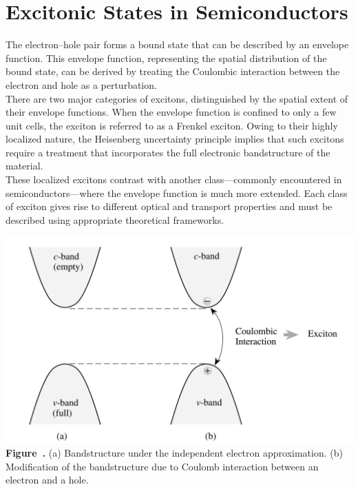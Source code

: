 \section{Excitonic States in Semiconductors}
The electron–hole pair forms a bound state that can be described by an envelope function. This envelope function, representing the spatial distribution of the bound state, can be derived by treating the Coulombic interaction between the electron and hole as a perturbation.\\
There are two major categories of excitons, distinguished by the spatial extent of their envelope functions. When the envelope function is confined to only a few unit cells, the exciton is referred to as a Frenkel exciton. Owing to their highly localized nature, the Heisenberg uncertainty principle implies that such excitons require a treatment that incorporates the full electronic bandstructure of the material.\\
These localized excitons contrast with another class—commonly encountered in semiconductors—where the envelope function is much more extended. Each class of exciton gives rise to different optical and transport properties and must be described using appropriate theoretical frameworks.
\begin{center}
	\begin{minipage}{0.8\textwidth}
		\centering
		\includegraphics[width=\textwidth]{img/hole_interaction.png}
		\\[0.5em]
		\textbf{Figure~\thefigure.} (a) Bandstructure under the independent electron approximation.
		(b) Modification of the bandstructure due to Coulomb interaction between an electron and a hole.
		\label{fig:hole_interaction}
	\end{minipage}
\end{center}
